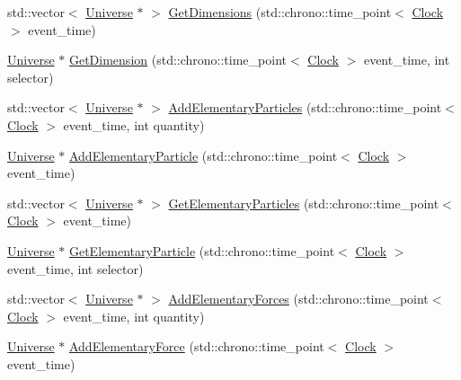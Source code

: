 \begin{DoxyCompactItemize}
std\+::vector$<$ \mbox{\hyperlink{classUniverse}{Universe}} $\ast$ $>$ \mbox{\hyperlink{classUniverse_a1869fc7bf43827378bab5a701f7f917a}{Get\+Dimensions}} (std\+::chrono\+::time\+\_\+point$<$ \mbox{\hyperlink{universe_8h_a0ef8d951d1ca5ab3cfaf7ab4c7a6fd80}{Clock}} $>$ event\+\_\+time)
\item 
\mbox{\hyperlink{classUniverse}{Universe}} $\ast$ \mbox{\hyperlink{classUniverse_ab79a380dee684c6dc304b571f4d28645}{Get\+Dimension}} (std\+::chrono\+::time\+\_\+point$<$ \mbox{\hyperlink{universe_8h_a0ef8d951d1ca5ab3cfaf7ab4c7a6fd80}{Clock}} $>$ event\+\_\+time, int selector)
\item 
std\+::vector$<$ \mbox{\hyperlink{classUniverse}{Universe}} $\ast$ $>$ \mbox{\hyperlink{classUniverse_a857cf7f208cd11c80736e82fa523feb5}{Add\+Elementary\+Particles}} (std\+::chrono\+::time\+\_\+point$<$ \mbox{\hyperlink{universe_8h_a0ef8d951d1ca5ab3cfaf7ab4c7a6fd80}{Clock}} $>$ event\+\_\+time, int quantity)
\item 
\mbox{\hyperlink{classUniverse}{Universe}} $\ast$ \mbox{\hyperlink{classUniverse_ab9c84e0576de50aa4fa46655832ce5e4}{Add\+Elementary\+Particle}} (std\+::chrono\+::time\+\_\+point$<$ \mbox{\hyperlink{universe_8h_a0ef8d951d1ca5ab3cfaf7ab4c7a6fd80}{Clock}} $>$ event\+\_\+time)
\item 
std\+::vector$<$ \mbox{\hyperlink{classUniverse}{Universe}} $\ast$ $>$ \mbox{\hyperlink{classUniverse_a168fd9bf7602adcba1de5dd93a212775}{Get\+Elementary\+Particles}} (std\+::chrono\+::time\+\_\+point$<$ \mbox{\hyperlink{universe_8h_a0ef8d951d1ca5ab3cfaf7ab4c7a6fd80}{Clock}} $>$ event\+\_\+time)
\item 
\mbox{\hyperlink{classUniverse}{Universe}} $\ast$ \mbox{\hyperlink{classUniverse_acef54e17666d17078c522388f8f6e4f9}{Get\+Elementary\+Particle}} (std\+::chrono\+::time\+\_\+point$<$ \mbox{\hyperlink{universe_8h_a0ef8d951d1ca5ab3cfaf7ab4c7a6fd80}{Clock}} $>$ event\+\_\+time, int selector)
\item 
std\+::vector$<$ \mbox{\hyperlink{classUniverse}{Universe}} $\ast$ $>$ \mbox{\hyperlink{classUniverse_a81d294300346e9f901836ab609cce942}{Add\+Elementary\+Forces}} (std\+::chrono\+::time\+\_\+point$<$ \mbox{\hyperlink{universe_8h_a0ef8d951d1ca5ab3cfaf7ab4c7a6fd80}{Clock}} $>$ event\+\_\+time, int quantity)
\item 
\mbox{\hyperlink{classUniverse}{Universe}} $\ast$ \mbox{\hyperlink{classUniverse_a90c573dec55f2b3ad5680015356f5f25}{Add\+Elementary\+Force}} (std\+::chrono\+::time\+\_\+point$<$ \mbox{\hyperlink{universe_8h_a0ef8d951d1ca5ab3cfaf7ab4c7a6fd80}{Clock}} $>$ event\+\_\+time)

\end{DoxyCompactItemize}
